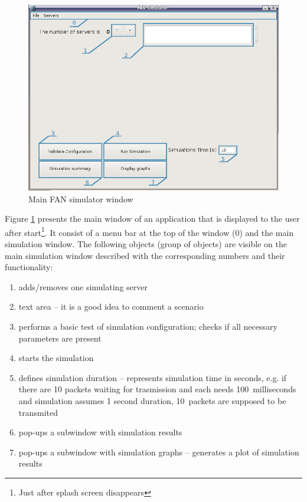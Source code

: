 \documentclass[a4paper,12pt]{article}
\begin{document}
		\begin{figure}[h]
		\includegraphics[width=150mm]{man/MainWindow.png}
		\caption{Main FAN simulator window}
		\label{MAINWINDOW}
		\end{figure}
	
		Figure \ref{MAINWINDOW} presents the main window of an application that is
		displayed to the user after start\footnote{Just after splash screen disappears}. It
		consist of a menu bar at the top of the window (0) and the main 
		simulation window. The following objects (group of objects) are visible on the
		main simulation window described with the corresponding numbers and their
		functionality:
		\begin{enumerate}
		\item {adds/removes one simulating server}
		\item {text area -- it is a good idea to comment a scenario}
		\item {performs a basic test of simulation configuration; checks if all
		necessary parameters are present}
		\item {starts the simulation}
		\item {defines simulation duration -- represents simulation time in seconds,
		e.g. if there are 10 packets waiting for trasmission and each needs
		100~milliseconds and simulation assumes 1 second duration, 10~packets are
		supposed to be transmited }
		\item {pop-ups a subwindow with simulation results}
		\item {pop-ups a subwindow with simulation graphs -- generates a plot
		of simulation results}
	    \end{enumerate}
    
\end{document}
